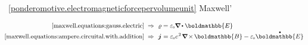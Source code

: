 \vspace{-0.2em}\noindent
{} ~\eqref{ponderomotive.electromagneticforcepervolumeunit}  Maxwell’

\nopagebreak\vspace{-0.1em}\begin{align*}
\eqref{maxwell.equations:gauss.electric}
& \hspace{.27em}\Rightarrow\hspace{.35em}
\chargedensity = \vacuumpermittivity \boldnabla \hspace{-0.1ex} \dotp \boldmathbb{E}
\\[-0.1em]
%
\eqref{maxwell.equations:ampere.circuital.with.addition}
& \hspace{.27em}\Rightarrow\hspace{.35em}
\currentdensity = \vacuumpermittivity \hspace{.1ex} c^{\hspace{.16ex}2} \hspace{.22ex} \boldnabla \hspace{-0.2ex} \times \hspace{-0.2ex} \boldmathbb{B} - \vacuumpermittivity \hspace{.1ex} \mathdotabove{\boldmathbb{E}}
\end{align*}
%
